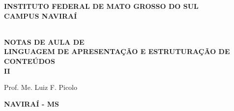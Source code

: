 \thispagestyle{empty}

\vfill
 \begin{center}
    
    {\large\bfseries INSTITUTO FEDERAL DE MATO GROSSO DO SUL} \\
    
    {\large\bfseries CAMPUS NAVIRAÍ}  \\ 

    \vspace*{1in}

    \vspace*{4cm}
    \noindent \\
    
    \large\bfseries{NOTAS DE AULA DE} \\
    \huge\bfseries{LINGUAGEM DE APRESENTAÇÃO E ESTRUTURAÇÃO DE CONTEÚDOS} \\ II
    
    \vspace*{4cm}
    
    \large{Prof. Me. Luiz F. Picolo}
    
    \vfill
    \large\bfseries{NAVIRAÍ - MS}
\end{center}

\normalsize


